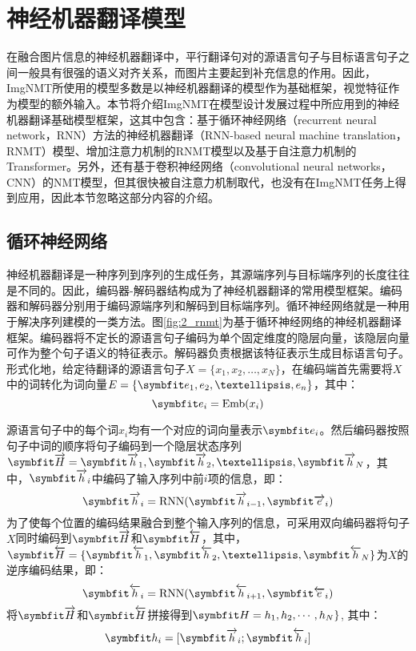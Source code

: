 \section{神经机器翻译模型}
在融合图片信息的神经机器翻译中，平行翻译句对的源语言句子与目标语言句子之间一般具有很强的语义对齐关系，而图片主要起到补充信息的作用。因此，ImgNMT所使用的模型多数是以神经机器翻译的模型作为基础框架，视觉特征作为模型的额外输入。本节将介绍ImgNMT在模型设计发展过程中所应用到的神经机器翻译基础模型框架，这其中包含：基于循环神经网络（recurrent neural network，RNN）方法的神经机器翻译（RNN-based neural machine translation，RNMT）模型\cite{1_DBLP:journals/corr/SutskeverVL14,2_cho-etal-2014-learning}、增加注意力机制的RNMT模型\cite{3_DBLP:journals/corr/BahdanauCB14,4_luong-etal-2015-effective}以及基于自注意力机制的Transformer\cite{5_DBLP:journals/corr/VaswaniSPUJGKP17}。另外，还有基于卷积神经网络（convolutional neural networks，CNN）的NMT模型\cite{6_DBLP:journals/corr/GehringAGYD17}，但其很快被自注意力机制取代，也没有在ImgNMT任务上得到应用，因此本节忽略这部分内容的介绍。

\subsection{循环神经网络}

神经机器翻译是一种序列到序列的生成任务，其源端序列与目标端序列的长度往往是不同的。因此，编码器-解码器结构成为了神经机器翻译的常用模型框架。编码器和解码器分别用于编码源端序列和解码到目标端序列。循环神经网络就是一种用于解决序列建模的一类方法。图\ref{fig:2_rnmt}为基于循环神经网络的神经机器翻译框架。编码器将不定长的源语言句子编码为单个固定维度的隐层向量，该隐层向量可作为整个句子语义的特征表示。解码器负责根据该特征表示生成目标语言句子。形式化地，给定待翻译的源语言句子$X=\{x_1,x_2,…,x_N\}$，在编码端首先需要将$X$中的词转化为词向量$E=\{\Vector{e_1,e_2,…,e_n}\}$，其中：
\begin{equation}
    \Vector{e_i}=\mathrm{Emb}(x_i)
\end{equation}

源语言句子中的每个词$x_i$均有一个对应的词向量表示$\Vector{e_i}$。然后编码器按照句子中词的顺序将句子编码到一个隐层状态序列$\rarwvec{H}={\rarwvec{h}_1,\rarwvec{h}_2,…,\rarwvec{h}_N}$，其中，$\rarwvec{h}_i$中编码了输入序列中前$i$项的信息，即：
\begin{equation}
    \rarwvec{h}_i=\mathrm{RNN}(\rarwvec{h}_{i-1},\rarwvec{e}_i)
\end{equation}
为了使每个位置的编码结果融合到整个输入序列的信息，可采用双向编码器将句子$X$同时编码到$\rarwvec{H}$和$\larwvec{H}$，其中，$\larwvec{H}=\{\larwvec{h}_1,\larwvec{h}_2,…,\larwvec{h}_N\}$为$X$的逆序编码结果，即：
\begin{equation}
    \larwvec{h}_i=\mathrm{RNN}(\larwvec{h}_{i+1},\larwvec{e}_i)
\end{equation}
将$\rarwvec{H}$和$\larwvec{H}$拼接得到$\Vector{H=h_1,h_2,\cdots,h_N}\}$, 其中：
\begin{equation}
    \Vector{h_i}=[\rarwvec{h}_i;\larwvec{h}_i]
\end{equation}

